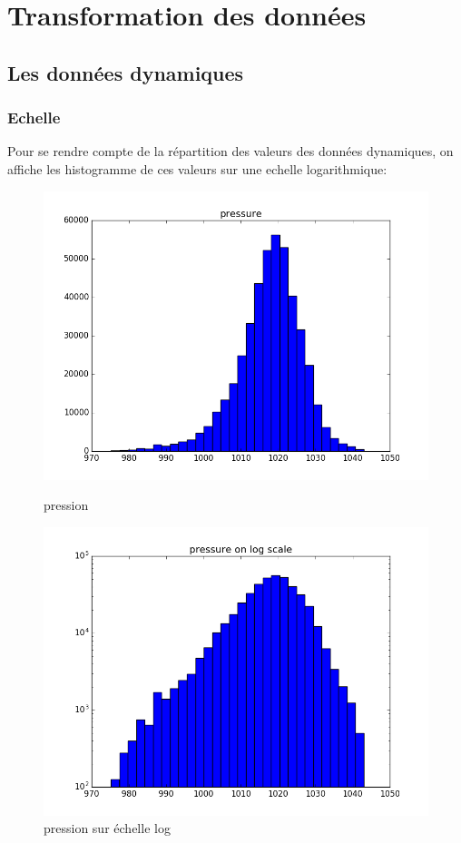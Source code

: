 \section{Transformation des données}

\subsection{Les données dynamiques}

\subsubsection{Echelle}

Pour se rendre compte de la répartition des valeurs des données dynamiques, on affiche les histogramme de ces valeurs sur une echelle logarithmique:

\begin{figure}[H]
\captionsetup{labelformat=empty}
  \includegraphics[width=\linewidth]{images/pression.png}
  \caption{pression}
\endminipage\hfill
{}
  \includegraphics[width=\linewidth]{images/log_pression.png}
  \caption{pression sur échelle log}
\endminipage\hfill
\end{figure}

